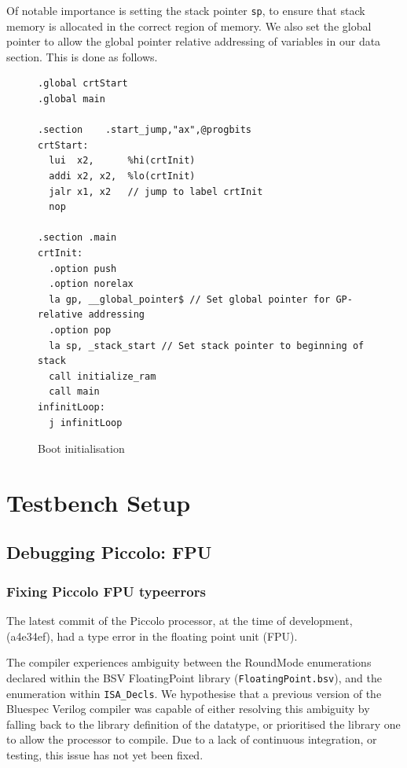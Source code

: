 \documentclass[a4paper,8pt]{report}
\begin{document}
Of notable importance is setting the stack pointer \texttt{sp}, to ensure that
stack memory is allocated in the correct region of memory. We also set the
global pointer to allow the global pointer relative addressing of variables in our
data section. This is done as follows.

\begin{figure}[h]
\lstset{language=[RISC-V]Assembler, style=customrv,xleftmargin=0.1\textwidth}
\begin{lstlisting}
.global crtStart
.global main

.section	.start_jump,"ax",@progbits
crtStart:
  lui  x2,      %hi(crtInit)
  addi x2, x2,  %lo(crtInit)
  jalr x1, x2   // jump to label crtInit
  nop

.section .main
crtInit:
  .option push
  .option norelax
  la gp, __global_pointer$ // Set global pointer for GP-relative addressing
  .option pop
  la sp, _stack_start // Set stack pointer to beginning of stack
  call initialize_ram
  call main
infinitLoop:
  j infinitLoop

\end{lstlisting}
\lstset{}
\caption{Boot initialisation}
\end{figure}

\section{Testbench Setup}
\subsection{Debugging Piccolo: FPU}
\subsubsection{Fixing Piccolo FPU typeerrors}
The latest commit of the Piccolo processor, at the time of development, (a4e34ef), had
a type error in the floating point unit (FPU). 

The compiler experiences ambiguity between the RoundMode enumerations declared
within the BSV FloatingPoint library (\texttt{FloatingPoint.bsv}), and the
enumeration within \texttt{ISA\_Decls}. We hypothesise that a previous version
of the Bluespec Verilog compiler was capable of either resolving this ambiguity
by falling back to the library definition of the datatype, or prioritised the
library one to allow the processor to compile. Due to a lack of continuous
integration, or testing, this issue has not yet been fixed.
\end{document}
